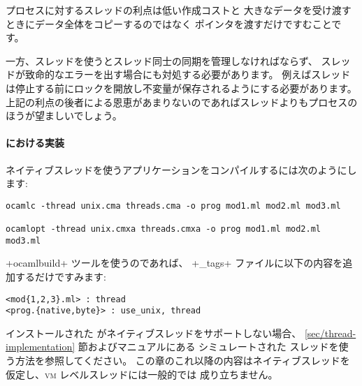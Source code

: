 プロセスに対するスレッドの利点は低い作成コストと
大きなデータを受け渡すときにデータ全体をコピーするのではなく
ポインタを渡すだけですむことです。

一方、スレッドを使うとスレッド同士の同期を管理しなければならず、
スレッドが致命的なエラーを出す場合にも対処する必要があります。
例えばスレッドは停止する前にロックを開放し不変量が保存されるようにする必要があります。
上記の利点の後者による恩恵があまりないのであればスレッドよりもプロセスのほうが望ましいでしょう。

\paragraph{{\ocaml} における実装}

ネイティブスレッドを使うアプリケーションをコンパイルするには次のようにします:
\begin{lstlisting}
ocamlc -thread unix.cma threads.cma -o prog mod1.ml mod2.ml mod3.ml

ocamlopt -thread unix.cmxa threads.cmxa -o prog mod1.ml mod2.ml mod3.ml
\end{lstlisting}
\ml+ocamlbuild+ ツールを使うのであれば、
\ml+_tags+ ファイルに以下の内容を追加するだけですみます:
\begin{lstlisting}
<mod{1,2,3}.ml> : thread
<prog.{native,byte}> : use_unix, thread
\end{lstlisting}
%
インストールされた \ocaml がネイティブスレッドをサポートしない場合、
\ref{sec/thread-implementation} 節およびマニュアルにある
シミュレートされた   スレッドを使う方法を参照してください。
この章のこれ以降の内容はネイティブスレッドを仮定し、\textsc{vm} レベルスレッドには一般的では
成り立ちません。

